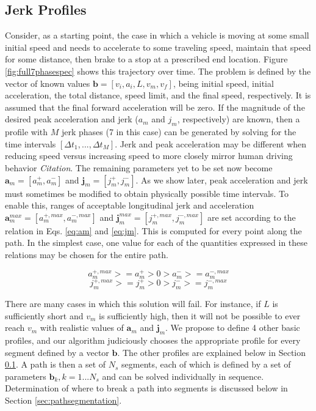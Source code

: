 \documentclass[letterpaper, 10 pt, conference]{ieeeconf}  %
\begin{document}

\subsection{Jerk Profiles} \label{sec:jerkprofiles}

Consider, as a starting point, the case in which a vehicle is moving at some small initial speed and needs to accelerate to some traveling speed, maintain that speed for some distance, then brake to a stop at a prescribed end location.
Figure \ref{fig:full7phasespec} shows this trajectory over time.
The problem is defined by the vector of known values $\mathbf{b}  = [v_i, a_i, L, v_m, v_f]$, being initial speed, initial acceleration, the total distance, speed limit, and the final speed, respectively.
It is assumed that the final forward acceleration will be zero.
If the magnitude of the desired peak acceleration and jerk ($a_m$ and $j_m$, respectively) are known, then a profile with $M$ jerk phases (7 in this case) can be generated by solving for the time intervals $[\Delta t_1, ..., \Delta t_M]$.
Jerk and peak acceleration may be different when reducing speed versus increasing speed to more closely mirror human driving behavior \emph{Citation}.
The remaining parameters yet to be set now become $\mathbf{a}_m = [a^+_m , a^-_m]$ and $\mathbf{j}_m = [j^+_m , j^-_m]$.
As we show later, peak acceleration and jerk must sometimes be modified to obtain physically possible time intervals.
To enable this, ranges of acceptable longitudinal jerk and acceleration $\mathbf{a}^{max}_m = [a^{+,max}_m , a^{-,max}_m]$ and $\mathbf{j}^{max}_m = [j^{+,max}_m , j^{-,max}_m]$ are set according to the relation in Eqs. \ref{eq:am} and \ref{eq:jm}.
This is computed for every point along the path.
In the simplest case, one value for each of the quantities expressed in these relations may be chosen for the entire path.

\begin{equation}
  a^{+,max}_m >= a^+_m > 0 > a^-_m >= a^{-,max}_m
  \label{eq:am}
\end{equation}
\begin{equation}
  j^{+,max}_m >= j^+_m > 0 > j^-_m >= j^{-,max}_m
  \label{eq:jm}
\end{equation}

There are many cases in which this solution will fail.
For instance, if $L$ is sufficiently short and $v_m$ is sufficiently high, then it will not be possible to ever reach $v_m$ with realistic values of $\mathbf{a}_m$ and $\mathbf{j}_m$.
We propose to define 4 other basic profiles, and our algorithm judiciously chooses the appropriate profile for every segment defined by a vector $\mathbf{b}$.
The other profiles are explained below in Section \ref{sec:jerkprofiles}.
A path is then a set of $N_s$ segments, each of which is defined by a set of parameters $\mathbf{b}_k, k = 1 ... N_s$ and can be solved individually in sequence.
Determination of where to break a path into segments is discussed below in Section \ref{sec:pathsegmentation}.
\end{document}
